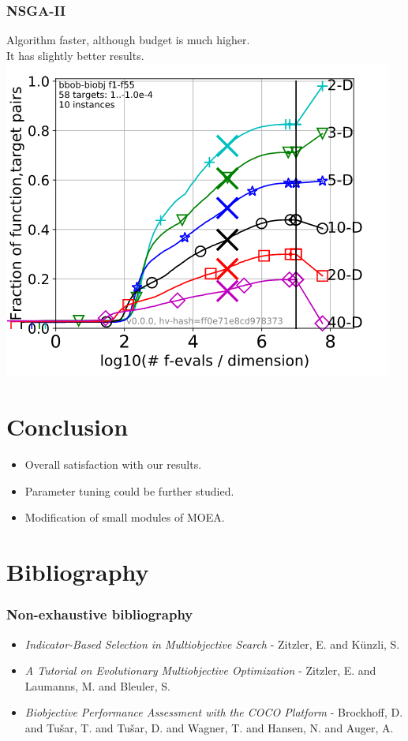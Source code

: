 \documentclass{beamer}
\begin{document}
\begin{frame}
\frametitle{NSGA-II}
Algorithm faster, although budget is much higher.\\
It has slightly better results.\\
\centering \includegraphics[scale=0.35]{NSGA.png}

\end{frame}

\section{Conclusion}
\begin{frame}
\begin{itemize}
    \item Overall satisfaction with our results.
    \item Parameter tuning could be further studied.
    \item Modification of small modules of MOEA.
\end{itemize}
\end{frame}

\section{Bibliography}
\begin{frame}
\frametitle{Non-exhaustive bibliography}
\begin{itemize}
\item \textit{Indicator-Based Selection in Multiobjective Search} - Zitzler, E. and Künzli, S.
\item \textit{A Tutorial on Evolutionary Multiobjective Optimization} - Zitzler, E. and Laumanns, M. and Bleuler, S.
\item \textit{Biobjective Performance Assessment with the {COCO} Platform} - Brockhoff, D. and Tu{\v s}ar, T. and Tu{\v s}ar, D. and Wagner, T. and Hansen, N. and Auger, A.
\end{itemize}
\end{frame}
\end{document}
